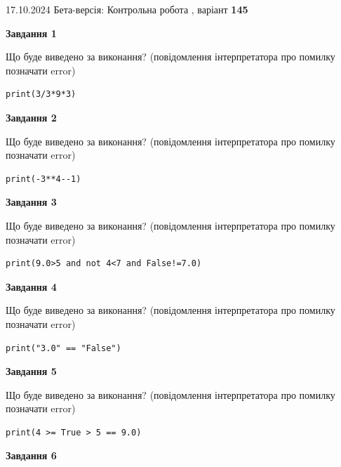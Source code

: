 \documentclass[12pt, ukrainian]{article}
\begin{document}
{\Large{17.10.2024 Бета-версія: Контрольна робота , варіант  \No \textbf { 145 }\par}}
{
\begin {large}
{\begin {center}\textbf{Завдання 1}\end {center}}

Що буде виведено за виконання? (повідомлення інтерпретатора про помилку позначати error)\par
\begin{verbatim}
print(3/3*9*3)
\end{verbatim}

{\begin {center}\textbf{Завдання 2}\end {center}}

Що буде виведено за виконання? (повідомлення інтерпретатора про помилку позначати error)\par
\begin{verbatim}
print(-3**4--1)
\end{verbatim}

{\begin {center}\textbf{Завдання 3}\end {center}}

Що буде виведено за виконання? (повідомлення інтерпретатора про помилку позначати error)\par
\begin{verbatim}
print(9.0>5 and not 4<7 and False!=7.0)
\end{verbatim}

{\begin {center}\textbf{Завдання 4}\end {center}}

Що буде виведено за виконання? (повідомлення інтерпретатора про помилку позначати error)\par
\begin{verbatim}
print("3.0" == "False")
\end{verbatim}

{\begin {center}\textbf{Завдання 5}\end {center}}

Що буде виведено за виконання? (повідомлення інтерпретатора про помилку позначати error)\par
\begin{verbatim}
print(4 >= True > 5 == 9.0)
\end{verbatim}

{\begin {center}\textbf{Завдання 6}\end {center}}


\end{large}}
\end{document}
